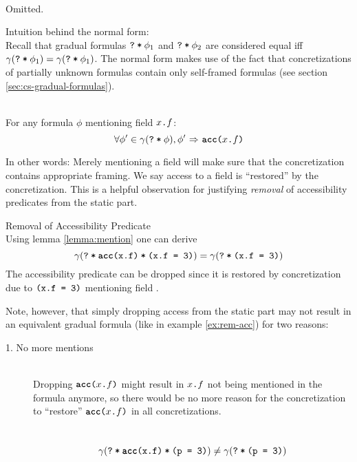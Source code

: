 \begin{proofatend}~\\
    Omitted.
    
    Intuition behind the normal form:\\
    Recall that gradual formulas $\textup{\texttt{\textup{\texttt{?}}\:*\:\ensuremath{\phi_1}}}$ and $\textup{\texttt{\textup{\texttt{?}}\:*\:\ensuremath{\phi_2}}}$ are considered equal iff $\gamma(\textup{\texttt{\textup{\texttt{?}}\:*\:\ensuremath{\phi_1}}}) = \gamma(\textup{\texttt{\textup{\texttt{?}}\:*\:\ensuremath{\phi_1}}})$.
    The normal form makes use of the fact that concretizations of partially unknown formulas contain only self-framed formulas (see section \ref{sec:cs-gradual-formulas}).
    
    \begin{lemma}\label{lemma:mention}~\\
        For any formula $\phi$ mentioning field $\textup{\texttt{$x$.$f$}}$:
        $$\forall \phi' \in \gamma(\textup{\texttt{\textup{\texttt{?}}\:*\:\ensuremath{\phi}}}), {\phi'} \,\,{\Rightarrow}\,\, {\textup{\texttt{\textbf{acc}($x$.$f$)}}}$$
    \end{lemma}
    In other words: Merely mentioning a field will make sure that the concretization contains appropriate framing.
    We say access to a field is “restored” by the concretization.
    This is a helpful observation for justifying \emph{removal} of accessibility predicates from the static part.
    
    \begin{example}{Removal of Accessibility Predicate}\label{ex:rem-acc}~\\
        Using lemma \ref{lemma:mention} one can derive
        \begin{displaymath}
        \gamma(\textup{\texttt{\textup{\texttt{?}}\:*\:\ensuremath{\textup{\texttt{\textup{\texttt{\textbf{acc}(x.f)}}\:*\:\textup{\texttt{(x.f = 3)}}}}}}}) = \gamma(\textup{\texttt{\textup{\texttt{?}}\:*\:\ensuremath{\textup{\texttt{(x.f = 3)}}}}})
        \end{displaymath}
        The accessibility predicate can be dropped since it is restored by concretization due to $\textup{\texttt{(x.f = 3)}}$ mentioning field .
    \end{example}
    
    Note, however, that simply dropping access from the static part may not result in an equivalent gradual formula (like in example \ref{ex:rem-acc}) for two reasons:
    \begin{description}
        \item[1. No more mentions]~\\
        Dropping $\textup{\texttt{\textbf{acc}($x$.$f$)}}$ might result in $\textup{\texttt{$x$.$f$}}$ not being mentioned in the formula anymore, so there would be no more reason for the concretization to “restore” $\textup{\texttt{\textbf{acc}($x$.$f$)}}$ in all concretizations.
        \begin{example}{}\label{ex:rem-acc-1}~\\
            \begin{displaymath}
            \gamma(\textup{\texttt{\textup{\texttt{?}}\:*\:\ensuremath{\textup{\texttt{\textup{\texttt{\textbf{acc}(x.f)}}\:*\:\textup{\texttt{(p = 3)}}}}}}}) \neq \gamma(\textup{\texttt{\textup{\texttt{?}}\:*\:\ensuremath{\textup{\texttt{(p = 3)}}}}})
            \end{displaymath}
        \end{example}
        

\end{description}
\end{proofatend}

